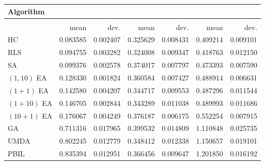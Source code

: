 \begin{tabular}{@{} l *{6}{>{{}}N{1}{2}} @{}}
\toprule
{Algorithm} &  \\
\midrule
&  &  &  \\
\midrule
& {mean} & {dev.} & {mean} & {dev.} & {mean} & {dev.} \\
\midrule
HC & 0.083585 & 0.002407 & 0.325629 & 0.008431 & 0.409214 & 0.009101 \\
RLS & 0.094755 & 0.003282 & 0.324008 & 0.009347 & 0.418763 & 0.012150 \\
SA & 0.099376 & 0.002578 & 0.374017 & 0.007797 & 0.473393 & 0.007590 \\
$(1,10)$ EA & 0.128330 & 0.001824 & 0.360584 & 0.007427 & 0.488914 & 0.006631 \\
$(1+1)$ EA & 0.142580 & 0.004207 & 0.344717 & 0.009553 & 0.487296 & 0.011544 \\
$(1+10)$ EA & 0.146705 & 0.002844 & 0.343289 & 0.011038 & 0.489993 & 0.011686 \\
$(10+1)$ EA & 0.176067 & 0.004249 & 0.376187 & 0.006175 & 0.552254 & 0.007915 \\
GA & 0.711316 & 0.017965 & 0.399532 & 0.014809 & 1.110848 & 0.025735 \\
UMDA & 0.802245 & 0.012779 & 0.348412 & 0.012338 & 1.150657 & 0.019101 \\
PBIL & 0.835394 & 0.012951 & 0.366456 & 0.009647 & 1.201850 & 0.016192 \\
\bottomrule
\end{tabular}
